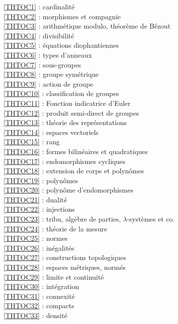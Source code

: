 \ref {THTOC1} : cardinalité\\
\ref {THTOC2} : morphismes et compagnie\\
\ref {THTOC3} : arithmétique modulo, théorème de Bézout\\
\ref {THTOC4} : divisibilité\\
\ref {THTOC5} : équations diophantiennes\\
\ref {THTOC6} : types d'anneaux\\
\ref {THTOC7} : sous-groupes\\
\ref {THTOC8} : groupe symétrique\\
\ref {THTOC9} : action de groupe\\
\ref {THTOC10} : classification de groupes\\
\ref {THTOC11} : Fonction indicatrice d'Euler\\
\ref {THTOC12} : produit semi-direct de groupes\\
\ref {THTOC13} : théorie des représentations\\
\ref {THTOC14} : espaces vectoriels\\
\ref {THTOC15} : rang\\
\ref {THTOC16} : formes bilinéaires et quadratiques\\
\ref {THTOC17} : endomorphismes cycliques\\
\ref {THTOC18} : extension de corps et polynômes\\
\ref {THTOC19} : polynômes\\
\ref {THTOC20} : polynôme d'endomorphismes\\
\ref {THTOC21} : dualité\\
\ref {THTOC22} : injections\\
\ref {THTOC23} : tribu, algèbre de parties, \( \lambda \)-systèmes et co.\\
\ref {THTOC24} : théorie de la mesure\\
\ref {THTOC25} : normes\\
\ref {THTOC26} : inégalités\\
\ref {THTOC27} : constructions topologiques\\
\ref {THTOC28} : espaces métriques, normés\\
\ref {THTOC29} : limite et continuité\\
\ref {THTOC30} : intégration\\
\ref {THTOC31} : connexité\\
\ref {THTOC32} : compacts\\
\ref {THTOC33} : densité\\
